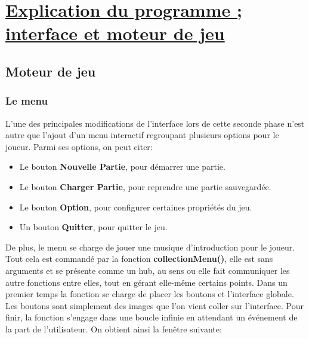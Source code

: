 \documentclass{article}
\begin{document}
\newpage

\section{\underline{Explication du programme ; interface et  moteur de jeu}}


\vspace{1.5 cm}
\subsection{Moteur de jeu}

			\subsubsection{Le menu}
	L'une des principales modifications de l'interface lors de cette seconde phase n'est autre que l'ajout d'un menu interactif regroupant plusieurs options pour le joueur. Parmi ses options, on peut citer:
\begin{itemize}
\item Le bouton \textbf{Nouvelle Partie}, pour démarrer une partie.
\item Le bouton \textbf{Charger Partie}, pour reprendre une partie sauvegardée.
\item Le bouton \textbf{Option}, pour configurer certaines propriétés du jeu.
\item Un bouton \textbf{Quitter}, pour quitter le jeu.
\end{itemize}
De plus, le menu se charge de jouer une musique d'introduction pour le joueur. Tout cela est commandé par la fonction \textbf{collectionMenu()}, elle est sans arguments et se présente comme un hub, au sens ou elle fait communiquer les autre fonctions entre elles, tout en gérant elle-même certains points. \newline
Dans un premier temps la fonction se charge de placer les boutons et l'interface globale. Les boutons sont simplement des images que l'on vient coller sur l'interface. Pour finir, la fonction s'engage dans une boucle infinie en attendant un événement de la part de l'utilisateur. On obtient ainsi la fenêtre suivante: 
\end{document}
